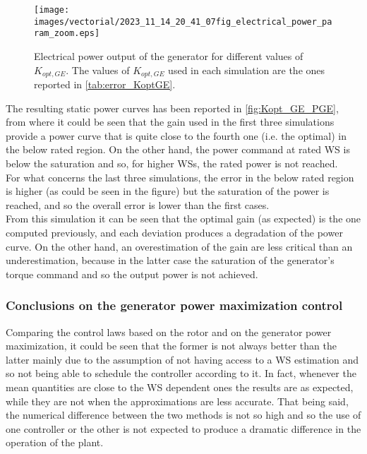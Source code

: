 \begin{figure}[!htbp]
  \centering
  \texttt{[image: images/vectorial/2023\_11\_14\_20\_41\_07fig\_electrical\_power\_param\_zoom.eps]}
  \caption{Electrical power output of the generator for different values of $K_{opt,GE}$. The values of $K_{opt,GE}$ used in each simulation are the ones reported in \autoref{tab:error_KoptGE}.}
  \label{fig:Kopt_GE_PGE}
\end{figure}

The resulting static power curves has been reported in \autoref{fig:Kopt_GE_PGE}, from where it could be seen that the gain used in the first three simulations provide a power curve that is quite close to the fourth one (i.e. the optimal) in the below rated region. On the other hand, the power command at rated WS is below the saturation and so, for higher WSs, the rated power is not reached. \\
For what concerns the last three simulations, the error in the below rated region is higher (as could be seen in the figure) but the saturation of the power is reached, and so the overall error is lower than the first cases. \\
From this simulation it can be seen that the optimal gain (as expected) is the one computed previously, and each deviation produces a degradation of the power curve. On the other hand, an overestimation of the gain are less critical than an underestimation, because in the latter case the saturation of the generator's torque command and so the output power is not achieved.

\subsubsection{Conclusions on the generator power maximization control}
Comparing the control laws based on the rotor and on the generator power maximization, it could be seen that the former is not always better than the latter mainly due to the assumption of not having access to a WS estimation and so not being able to schedule the controller according to it. In fact, whenever the mean quantities are close to the WS dependent ones the results are as expected, while they are not when the approximations are less accurate. That being said, the numerical difference between the two methods is not so high and so the use of one controller or the other is not expected to produce a dramatic difference in the operation of the plant.  


